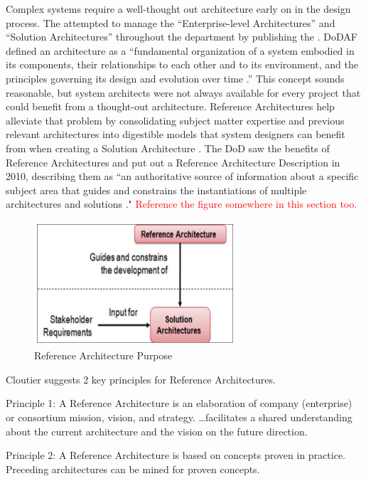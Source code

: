 Complex systems require a well-thought out architecture early on in the design process. The  attempted to manage the “Enterprise-level Architectures” and “Solution Architectures” throughout the department by publishing the . DoDAF defined an architecture as a “fundamental organization of a system embodied in its components, their relationships to each other and to its environment, and the principles governing its design and evolution over time \citep{DoDAF}.” This concept sounds reasonable, but system architects were not always available for every project that could benefit from a thought-out architecture. Reference Architectures help alleviate that problem by consolidating subject matter expertise and previous relevant architectures into digestible models that system designers can benefit from when creating a Solution Architecture \citep{Cloutier2010}. The DoD saw the benefits of Reference Architectures and put out a Reference Architecture Description in 2010, describing them as “an authoritative source of information about a  specific subject area that guides and constrains the instantiations of multiple  architectures and solutions \citep{RADescription}." 
\textcolor{red}{Reference the figure somewhere in this section too.}

\begin{figure}[!h]
    \centering
    \includegraphics[width=3in]{Thesis/Literature_Review/Lit Review Figures/Ref Arc Purpose.png}
    \caption{Reference Architecture Purpose}
    \label{fig:Ref Arc Purpose}
\end{figure}

Cloutier suggests 2 key principles for Reference Architectures.

Principle 1: A Reference Architecture is an elaboration of company (enterprise) or consortium mission, vision, and strategy.   …facilitates a shared understanding about the current architecture and the vision on the future direction.

Principle 2: A Reference Architecture is based on concepts proven in practice. Preceding architectures can be mined for proven concepts.

